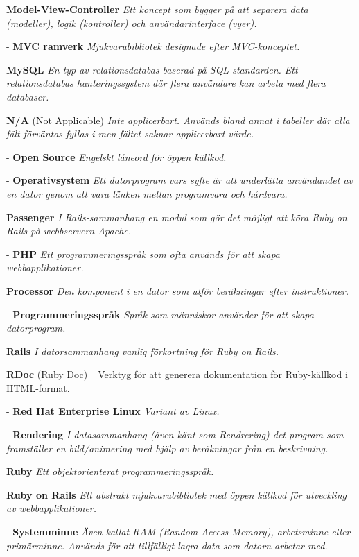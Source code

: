 \documentclass[a4paper, twoside, 11pt, titlepage]{article}
\begin{document}
\textbf{Model-View-Controller} \emph{Ett koncept som bygger på att separera data (modeller), logik (kontroller) och användarinterface (vyer).}

- \textbf{MVC ramverk} \emph{Mjukvarubibliotek designade efter MVC-konceptet.}

\textbf{MySQL} \emph{En typ av relationsdatabas baserad på SQL-standarden. Ett relationsdatabas hanteringssystem där flera användare kan arbeta med flera databaser.}

\textbf{N/A} (Not Applicable) \emph{Inte applicerbart. Används bland annat i tabeller där alla fält förväntas fyllas i men fältet saknar applicerbart värde.}

- \textbf{Open Source} \emph{Engelskt låneord för öppen källkod.}

- \textbf{Operativsystem} \emph{Ett datorprogram vars syfte är att underlätta användandet av en dator genom att vara länken mellan programvara och hårdvara.}

\textbf{Passenger} \emph{I Rails-sammanhang en modul som gör det möjligt att köra Ruby on Rails på webbservern Apache.}

- \textbf{PHP} \emph{Ett programmeringsspråk som ofta används för att skapa webbapplikationer.}

\textbf{Processor} \emph{Den komponent i en dator som utför beräkningar efter instruktioner.}

- \textbf{Programmeringsspråk} \emph{Språk som människor använder för att skapa datorprogram.}

\textbf{Rails} \emph{I datorsammanhang vanlig förkortning för Ruby on Rails.}

\textbf{RDoc} (Ruby Doc) \_Verktyg för att generera dokumentation för Ruby-källkod i HTML-format.

- \textbf{Red Hat Enterprise Linux} \emph{Variant av Linux.}

- \textbf{Rendering} \emph{I datasammanhang (även känt som Rendrering) det program som framställer en bild/animering med hjälp av beräkningar från en beskrivning.}

\textbf{Ruby} \emph{Ett objektorienterat programmeringsspråk.}

\textbf{Ruby on Rails} \emph{Ett abstrakt mjukvarubibliotek med öppen källkod för utveckling av webbapplikationer.}

- \textbf{Systemminne} \emph{Även kallat RAM (Random Access Memory), arbetsminne eller primärminne. Används för att tillfälligt lagra data som datorn arbetar med.}
\end{document}
